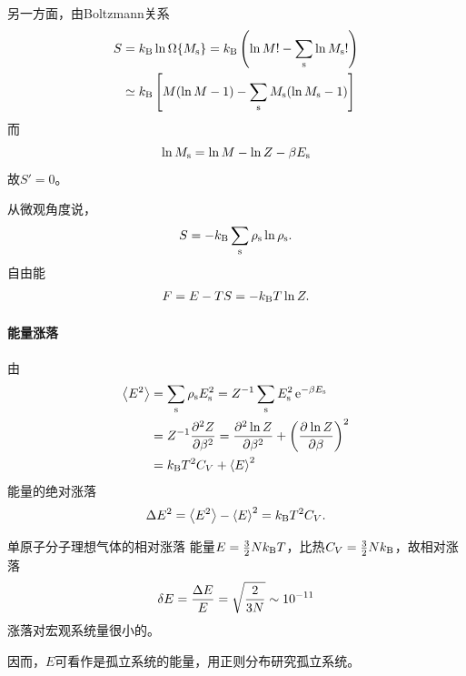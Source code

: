 另一方面，由Boltzmann关系
\begin{align*}
	S&=\kB\ln\Omega\{M_\st\}=\kB\kh{\ln M!-\sum_\st\ln M_\st!}\\
	&\simeq\kB\fkh{M(\ln M-1)-\sum_\st M_\st(\ln M_\st-1)}
\end{align*}
而
\[
	\ln M_\st=\ln M-\ln Z-\beta E_\st
\]
故$S'=0$。

从微观角度说，
\begin{align}
	S=-\kB\sum_\st\rho_\st\ln\rho_\st.
\end{align}
自由能
\begin{align}
	F=E-TS=-\kB T\ln Z.
\end{align}
\paragraph{能量涨落}由
\begin{align*}
	\ave{E^2}&=\sum_\st\rho_\st E_\st^2=Z^{-1}\sum_\st E_\st^2\e{-\beta E_\st}\\
	&=Z^{-1}\pv[2]Z\beta=\pv[2]{\ln Z}\beta+\kh{\pv{\ln Z}\beta}^2\\
	&=\kB T^2C_V+\ave E^2
\end{align*}
能量的绝对涨落
\begin{align}
	\D E^2=\ave{E^2}-\ave E^2=\kB T^2C_V.
\end{align}
\begin{example}{单原子分子理想气体的相对涨落}{}
	能量$E=\frac32 N\kB T$，比热$C_V=\frac32N\kB$，故相对涨落
	\[
		\vd E=\frac{\D E}E=\sqrt{\frac2{3N}}\sim 10^{-11}
	\]
	涨落对宏观系统量很小的。
\end{example}
因而，$E$可看作是孤立系统的能量，用正则分布研究孤立系统。
